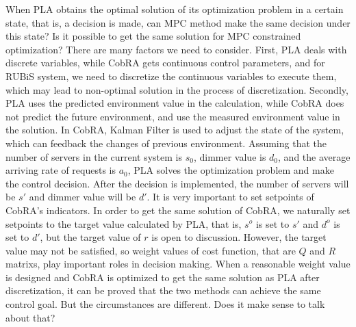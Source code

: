 \documentclass[sigconf]{acmart}
\begin{document}
When PLA obtains the optimal solution of its optimization problem in a certain state, that is, a decision is made, can MPC method make the same decision under this state? Is it possible to get the same solution for MPC constrained optimization? There are many factors we need to consider. First, PLA deals with discrete variables, while CobRA gets continuous control parameters, and for RUBiS system, we need to discretize the continuous variables to execute them, which may lead to non-optimal solution in the process of discretization. Secondly, PLA uses the predicted environment value in the calculation, while CobRA does not predict the future environment, and use the measured environment value in the solution. In CobRA, Kalman Filter is used to adjust the state of the system, which can feedback the changes of previous environment. Assuming that the number of servers in the current system is $s_0$, dimmer value is $d_0$, and the average arriving rate of requests is $a_0$, PLA solves the optimization problem and make the control decision. After the decision is implemented, the number of servers will be $s'$ and dimmer value will be $d'$. It is very important to set setpoints of CobRA's indicators. In order to get the same solution of CobRA, we naturally set setpoints to the target value calculated by PLA, that is, $s^o$ is set to $s'$ and $d^o$ is set to $d'$, but the target value of $r$ is open to discussion. However, the target value may not be satisfied, so weight values of cost function, that are $Q$ and $R$ matrixs, play important roles in decision making. When a reasonable weight value is designed and CobRA is optimized to get the same solution as PLA after discretization, it can be proved that the two methods can achieve the same control goal. But the circumstances are different. Does it make sense to talk about that?
\end{document}
